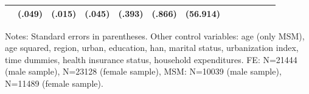 \begin{table}[h]
\begin{adjustbox}{max width=\textwidth, center}
\begin{threeparttable}
{\begin{tabular}{l*{6}{S
S}}
                &   (.049)         &   (.015)         &   (.045)         &   (.393)         &   (.866)         & (56.914)         \\                
\bottomrule
\end{tabular}
\begin{tablenotes}
\item Notes:   Standard errors in parentheses.
Other control variables: age (only MSM), age squared, region, urban, education, han, marital status, urbanization index, time dummies, health insurance status, household expenditures. FE:  N=21444 (male sample), N=23128 (female sample), MSM: N=10039 (male sample), N=11489 (female sample).
\end{tablenotes}
}
\end{threeparttable}
\end{adjustbox}
\end{table}




